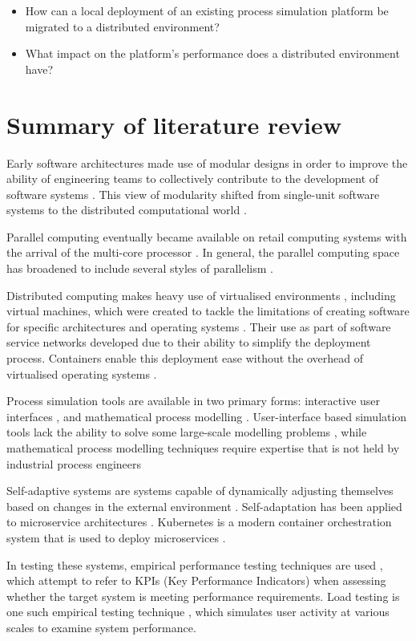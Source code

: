 \begin{itemize}[itemsep=0pt]
    \item How can a local deployment of an existing process simulation platform be migrated to a distributed environment?
    \item What impact on the platform's performance does a distributed environment have?
\end{itemize}

\section{Summary of literature review}

Early software architectures made use of modular designs in order to improve the ability of engineering teams to collectively contribute to the development of software systems \cite{parnas_criteria_1972}. This view of modularity shifted from single-unit software systems to the distributed computational world \cite{sifakis_framework_2005}.

Parallel computing eventually became available on retail computing systems with the arrival of the multi-core processor \cite{bridges_revisiting_2007}. In general, the parallel computing space has broadened to include several styles of parallelism \cite{xu_four_2009}.

Distributed computing makes heavy use of virtualised environments \cite{goldberg_survey_1974}, including virtual machines, which were created to tackle the limitations of creating software for specific architectures and operating systems \cite{whitaker_denali_2001}. Their use as part of software service networks developed due to their ability to simplify the deployment process. Containers enable this deployment ease without the overhead of virtualised operating systems \cite{pietri_mapping_2017}.

Process simulation tools are available in two primary forms: interactive user interfaces \cite{merchan_computer-aided_2016}, and mathematical process modelling \cite{pistikopoulos_process_2021}. User-interface based simulation tools lack the ability to solve some large-scale modelling problems \cite{biegler_recent_2014}, while mathematical process modelling techniques require expertise that is not held by industrial process engineers \cite{martin_sustainable_2022} 

Self-adaptive systems are systems capable of dynamically adjusting themselves based on changes in the external environment \cite{weyns_engineering_2018}. Self-adaptation has been applied to microservice architectures \cite{filho_self-adaptive_2021}. Kubernetes is a modern container orchestration system that is used to deploy microservices \cite{figueira_developing_2024}.

In testing these systems, empirical performance testing techniques are used \cite{cheng_performance_2008}, which attempt to refer to KPIs (Key Performance Indicators) when assessing whether the target system is meeting performance requirements. Load testing is one such empirical testing technique \cite{aydemir_building_2022}, which simulates user activity at various scales to examine system performance.